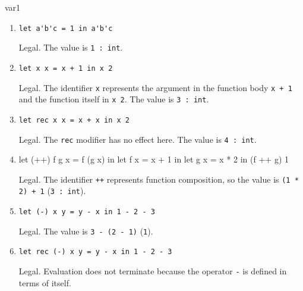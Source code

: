 \begin{exercise}{var1}
\begin{enumerate}
\item \lstinline!let a'b'c = 1 in a'b'c!

\begin{answer}\ifanswers
Legal.  The value is \hbox{\lstinline/1 : int/}.
\fi\end{answer}

\item \lstinline!let x x = x + 1 in x 2!

\begin{answer}\ifanswers
Legal.  The identifier \hbox{\lstinline/x/} represents the argument in the function body
  \hbox{\lstinline/x + 1/} and the function itself in \hbox{\lstinline/x 2/}.  The value is \hbox{\lstinline/3 : int/}.
\fi\end{answer}

\item \lstinline!let rec x x = x + x in x 2!

\begin{answer}\ifanswers
Legal.  The \hbox{\lstinline/rec/} modifier has no effect here.  The value is \hbox{\lstinline/4 : int/}.
\fi\end{answer}

\item

\begin{ocamllistinge}
let (++) f g x = f (g x) in
let f x = x + 1 in
let g x = x * 2 in
(f ++ g) 1
\end{ocamllistinge}

\begin{answer}\ifanswers
Legal.  The identifier \hbox{\lstinline/++/} represents function composition, so the value is
\hbox{\lstinline/(1 * 2) + 1/} (\hbox{\lstinline/3 : int/}).
\fi\end{answer}

\item \lstinline!let (-) x y = y - x in 1 - 2 - 3!

\begin{answer}\ifanswers
Legal.  The value is \hbox{\lstinline/3 - (2 - 1)/} (\hbox{\lstinline/1/}).
\fi\end{answer}

\item \lstinline!let rec (-) x y = y - x in 1 - 2 - 3!

\begin{answer}\ifanswers
Legal.  Evaluation does not terminate because the operator \hbox{\lstinline/-/} is defined in terms of
itself.
\fi\end{answer}


\end{enumerate}
\end{exercise}
